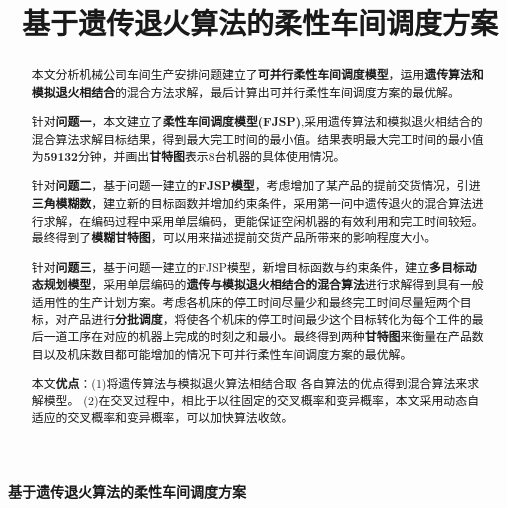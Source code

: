 \documentclass{whutmod}
\title{基于遗传退火算法的柔性车间调度方案}
\begin{document}
\begin{spacing}{1.2}

        \date{}
        
	\begin{center}
		\textbf{基于遗传退火算法的柔性车间调度方案}
		\end{center}
	
	\begin{abstract}\setlength{\parskip}{0.3\baselineskip}
		本文分析机械公司车间生产安排问题建立了\textbf{可并行柔性车间调度模型}，运用\textbf{遗传算法和模拟退火相结合}的混合方法求解，最后计算出可并行柔性车间调度方案的最优解。
		
		针对\textbf{问题一}，本文建立了\textbf{柔性车间调度模型(FJSP)},采用遗传算法和模拟退火相结合的混合算法求解目标结果，得到最大完工时间的最小值。结果表明最大完工时间的最小值为\textbf{59132}分钟，并画出\textbf{甘特图}表示8台机器的具体使用情况。
		
		针对\textbf{问题二}，基于问题一建立的\textbf{FJSP模型}，考虑增加了某产品的提前交货情况，引进\textbf{三角模糊数}，建立新的目标函数并增加约束条件，采用第一问中遗传退火的混合算法进行求解，在编码过程中采用单层编码，更能保证空闲机器的有效利用和完工时间较短。最终得到了\textbf{模糊甘特图}，可以用来描述提前交货产品所带来的影响程度大小。
  
	    针对\textbf{问题三}，基于问题一建立的FJSP模型，新增目标函数与约束条件，建立\textbf{多目标动态规划模型}，采用单层编码的\textbf{遗传与模拟退火相结合的混合算法}进行求解得到具有一般适用性的生产计划方案。考虑各机床的停工时间尽量少和最终完工时间尽量短两个目标，对产品进行\textbf{分批调度}，将使各个机床的停工时间最少这个目标转化为每个工件的最后一道工序在对应的机器上完成的时刻之和最小。最终得到两种\textbf{甘特图}来衡量在产品数目以及机床数目都可能增加的情况下可并行柔性车间调度方案的最优解。

       本文\textbf{优点}：(1)将遗传算法与模拟退火算法相结合取
       各自算法的优点得到混合算法来求解模型。
         (2)在交叉过程中，相比于以往固定的交叉概率和变异概率，本文采用动态自适应的交叉概率和变异概率，可以加快算法收敛。
		
		
		
		
		
		

\end{abstract}
\end{spacing}
\end{document}
